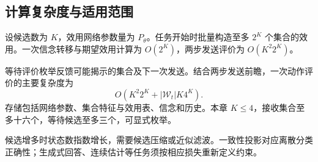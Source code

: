 \subsection{计算复杂度与适用范围}
\label{rq3:subsec:complexity}

设候选数为 $K$，效用网络参数量为 $P_\theta$。任务开始时批量构造至多 $2^K$ 个集合的效用。一次信念转移与期望效用计算为 $O(2^K)$，两步发送评价为 $O(K^2 2^K)$。

等待评价枚举反馈可能揭示的集合及下一次发送。结合两步发送前瞻，一次动作评价的主要复杂度为
\begin{equation}
  O\left(K^2 2^K+|\mathcal W_t|K4^K\right).
  \label{rq3:eq:complexity}
\end{equation}
存储包括网络参数、集合特征与效用表、信念和历史。本章 $K\le4$，接收集合至多十六个，等待候选至多三个，可显式枚举。

候选增多时状态数指数增长，需要候选压缩或近似滤波。一致性投影对应离散分类正确性；生成式回答、连续估计等任务须按相应损失重新定义约束。
